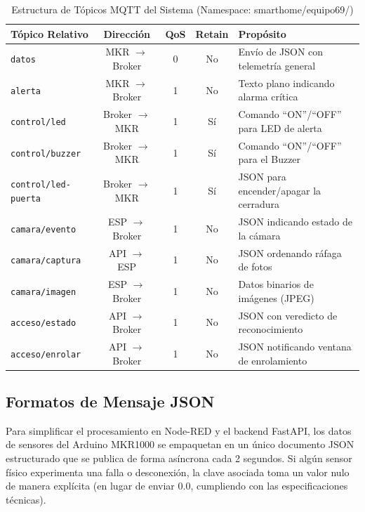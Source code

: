 \documentclass[12pt,letterpaper]{article}
\begin{document}
\begin{table}[H]
    \centering
    \caption{Estructura de Tópicos MQTT del Sistema (Namespace: smarthome/equipo69/)}
    \label{tab:topicos_mqtt}
    \begin{tabular}{lcccl}
        \toprule
        \textbf{Tópico Relativo} & \textbf{Dirección} & \textbf{QoS} & \textbf{Retain} & \textbf{Propósito} \\
        \midrule
        \texttt{datos} & MKR $\rightarrow$ Broker & 0 & No & Envío de JSON con telemetría general \\
        \texttt{alerta} & MKR $\rightarrow$ Broker & 1 & No & Texto plano indicando alarma crítica \\
        \texttt{control/led} & Broker $\rightarrow$ MKR & 1 & Sí & Comando ``ON''/``OFF'' para LED de alerta \\
        \texttt{control/buzzer} & Broker $\rightarrow$ MKR & 1 & Sí & Comando ``ON''/``OFF'' para el Buzzer \\
        \texttt{control/led-puerta} & Broker $\rightarrow$ MKR & 1 & Sí & JSON para encender/apagar la cerradura \\
        \texttt{camara/evento} & ESP $\rightarrow$ Broker & 1 & No & JSON indicando estado de la cámara \\
        \texttt{camara/captura} & API $\rightarrow$ ESP & 1 & No & JSON ordenando ráfaga de fotos \\
        \texttt{camara/imagen} & ESP $\rightarrow$ Broker & 1 & No & Datos binarios de imágenes (JPEG) \\
        \texttt{acceso/estado} & API $\rightarrow$ Broker & 1 & No & JSON con veredicto de reconocimiento \\
        \texttt{acceso/enrolar} & API $\rightarrow$ Broker & 1 & No & JSON notificando ventana de enrolamiento \\
        \bottomrule
    \end{tabular}
\end{table}

\subsection{Formatos de Mensaje JSON}
Para simplificar el procesamiento en Node-RED y el backend FastAPI, los datos de sensores del Arduino MKR1000 se empaquetan en un único documento JSON estructurado que se publica de forma asíncrona cada 2 segundos. Si algún sensor físico experimenta una falla o desconexión, la clave asociada toma un valor nulo de manera explícita (en lugar de enviar $0.0$, cumpliendo con las especificaciones técnicas).
\end{document}
